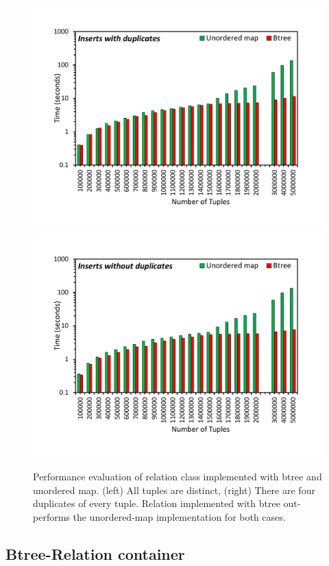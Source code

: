 

\begin{figure}[t]
	{\includegraphics[width=.50\textwidth,  trim={0cm 0cm 0cm 0cm, 
			clip}]{results/inserts_with_duplicates.pdf}}\hfill%
	{\includegraphics[width=.50\textwidth,  trim={0cm 0cm 0cm 0cm,
			clip}]{results/inserts_with_no_duplicates.pdf}}\hfill%
	\centering
	\caption{Performance evaluation of relation class implemented with btree and unordered map. (left) All tuples are distinct, (right) There are four duplicates of every tuple. Relation implemented with btree out-performs the unordered-map implementation for both cases.}
	\label{fig:tuple_inserts}
\end{figure}


\subsection{Btree-Relation container}
\label{sec:relation}

